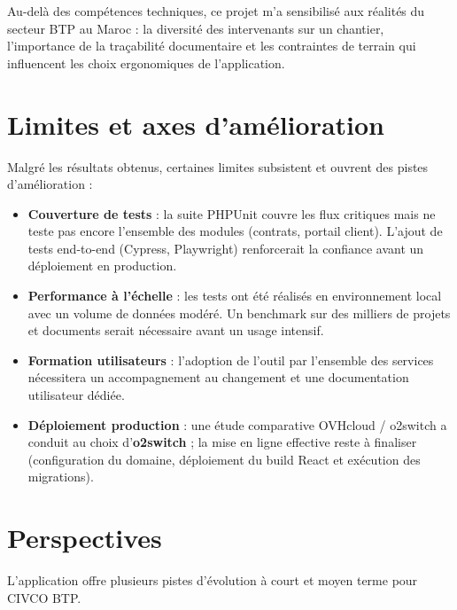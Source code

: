 \medskip

Au-delà des compétences techniques, ce projet m'a sensibilisé aux réalités du
secteur BTP au Maroc : la diversité des intervenants sur un chantier, l'importance
de la traçabilité documentaire et les contraintes de terrain qui influencent les
choix ergonomiques de l'application.

\section*{Limites et axes d'amélioration}

Malgré les résultats obtenus, certaines limites subsistent et ouvrent des pistes
d'amélioration :

\begin{itemize}
  \item \textbf{Couverture de tests} : la suite PHPUnit couvre les flux critiques
  mais ne teste pas encore l'ensemble des modules (contrats, portail client).
  L'ajout de tests end-to-end (Cypress, Playwright) renforcerait la confiance
  avant un déploiement en production.
  \item \textbf{Performance à l'échelle} : les tests ont été réalisés en
  environnement local avec un volume de données modéré. Un benchmark sur des
  milliers de projets et documents serait nécessaire avant un usage intensif.
  \item \textbf{Formation utilisateurs} : l'adoption de l'outil par l'ensemble des
  services nécessitera un accompagnement au changement et une documentation
  utilisateur dédiée.
  \item \textbf{Déploiement production} : une étude comparative OVHcloud / o2switch a
  conduit au choix d'\textbf{o2switch} ; la mise en ligne effective reste à finaliser
  (configuration du domaine, déploiement du build React et exécution des migrations).
\end{itemize}

\section*{Perspectives}

L'application offre plusieurs pistes d'évolution à court et moyen terme pour CIVCO BTP.

\medskip

